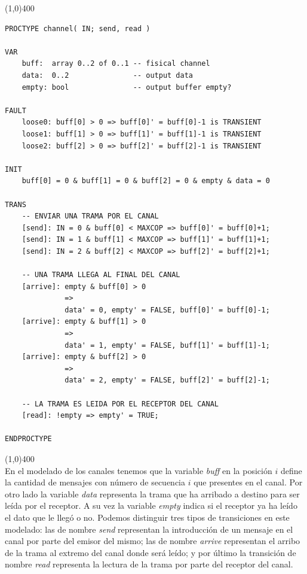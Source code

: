 \documentclass[titlepage, 12pt]{book}
\begin{document}
\noindent \line(1,0){400}
\begin{verbatim}
PROCTYPE channel( IN; send, read )

VAR
    buff:  array 0..2 of 0..1 -- fisical channel
    data:  0..2               -- output data
    empty: bool               -- output buffer empty?

FAULT
    loose0: buff[0] > 0 => buff[0]' = buff[0]-1 is TRANSIENT
    loose1: buff[1] > 0 => buff[1]' = buff[1]-1 is TRANSIENT
    loose2: buff[2] > 0 => buff[2]' = buff[2]-1 is TRANSIENT
    
INIT
    buff[0] = 0 & buff[1] = 0 & buff[2] = 0 & empty & data = 0

TRANS
    -- ENVIAR UNA TRAMA POR EL CANAL
    [send]: IN = 0 & buff[0] < MAXCOP => buff[0]' = buff[0]+1;
    [send]: IN = 1 & buff[1] < MAXCOP => buff[1]' = buff[1]+1;
    [send]: IN = 2 & buff[2] < MAXCOP => buff[2]' = buff[2]+1;

    -- UNA TRAMA LLEGA AL FINAL DEL CANAL
    [arrive]: empty & buff[0] > 0 
              => 
              data' = 0, empty' = FALSE, buff[0]' = buff[0]-1;
    [arrive]: empty & buff[1] > 0 
              => 
              data' = 1, empty' = FALSE, buff[1]' = buff[1]-1;
    [arrive]: empty & buff[2] > 0 
              => 
              data' = 2, empty' = FALSE, buff[2]' = buff[2]-1;

    -- LA TRAMA ES LEIDA POR EL RECEPTOR DEL CANAL
    [read]: !empty => empty' = TRUE;

ENDPROCTYPE

\end{verbatim}

\noindent \line(1,0){400}\\

En el modelado de los canales tenemos que la variable \textit{buff} en la posici\'on $i$ define la cantidad de mensajes con n\'umero de secuencia $i$ que presentes en el canal. Por otro lado la variable \textit{data} representa la trama que ha arribado a destino para ser le\'ida por el receptor. A su vez la variable \textit{empty} indica si el receptor ya ha le\'ido el dato que le lleg\'o o no. Podemos distinguir tres tipos de transiciones en este modelado: las de nombre \textit{send} representan la introducci\'on de un mensaje en el canal por parte del emisor del mismo; las de nombre \textit{arrive} representan el arribo de la trama al extremo del canal donde ser\'a le\'ido; y por \'ultimo la transici\'on de nombre \textit{read} representa la lectura de la trama por parte del receptor del canal.
\end{document}
